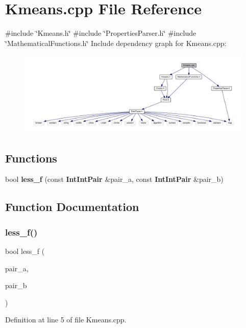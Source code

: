 \section{Kmeans.\+cpp File Reference}
\label{_kmeans_8cpp}
{\ttfamily \#include \char`\"{}Kmeans.\+h\char`\"{}}\newline
{\ttfamily \#include \char`\"{}Properties\+Parser.\+h\char`\"{}}\newline
{\ttfamily \#include \char`\"{}Mathematical\+Functions.\+h\char`\"{}}\newline
Include dependency graph for Kmeans.\+cpp\+:\nopagebreak
\begin{figure}[H]
\begin{center}
\leavevmode
\includegraphics[width=350pt]{_kmeans_8cpp__incl}
\end{center}
\end{figure}
\subsection*{Functions}
\begin{DoxyCompactItemize}
\item 
bool \textbf{ less\+\_\+f} (const \textbf{ Int\+Int\+Pair} \&pair\+\_\+a, const \textbf{ Int\+Int\+Pair} \&pair\+\_\+b)
\end{DoxyCompactItemize}


\subsection{Function Documentation}
\mbox{\label{_kmeans_8cpp_af55f0370ee6815bfd82fce81e16ad74e}} 
\subsubsection{less\+\_\+f()}
{\footnotesize\ttfamily bool less\+\_\+f (\begin{DoxyParamCaption}\item[{const \textbf{ Int\+Int\+Pair} \&}]{pair\+\_\+a,  }\item[{const \textbf{ Int\+Int\+Pair} \&}]{pair\+\_\+b }\end{DoxyParamCaption})}



Definition at line 5 of file Kmeans.\+cpp.

